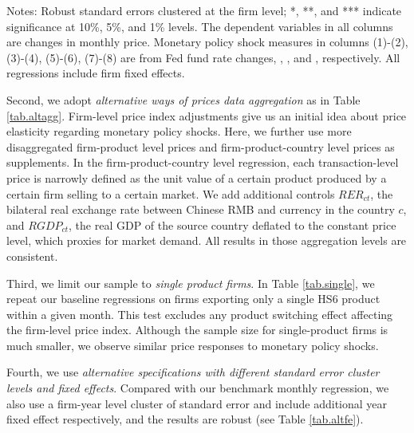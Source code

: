 \begin{table}[htbp]
{\begin{threeparttable}
\begin{tabular}{lcccccccc}
        \bottomrule
    \end{tabular}
        \begin{tablenotes}
            \footnotesize
            \item Notes: Robust standard errors clustered at the firm level;  *, **, and *** indicate significance at 10\%, 5\%, and 1\% levels. The dependent variables in all columns are changes in monthly price. Monetary policy shock measures in columns (1)-(2), (3)-(4), (5)-(6), (7)-(8) are from Fed fund rate changes, \cite{nakamura2018high}, \cite{acosta2022perceived}, and \cite{jarocinski2020deconstructing}, respectively. All regressions include firm fixed effects.
	\end{tablenotes}
    \end{threeparttable}
    }
    \label{tab.altmps}
\end{table}

Second, we adopt \textit{alternative ways of prices data aggregation} as in Table \ref{tab.altagg}. Firm-level price index adjustments give us an initial idea about price elasticity regarding monetary policy shocks. Here, we further use more disaggregated firm-product level prices and firm-product-country level prices as supplements. In the firm-product-country level regression, each transaction-level price is narrowly defined as the unit value of a certain product produced by a certain firm selling to a certain market. We add additional controls $RER_{ct}$, the bilateral real exchange rate between Chinese RMB and currency in the country $c$, and $RGDP_{ct}$, the real GDP of the source country deflated to the constant price level, which proxies for market demand. All results in those aggregation levels are consistent. 

Third, we limit our sample to \textit{single product firms}. In Table \ref{tab.single}, we repeat our baseline regressions on firms exporting only a single HS6 product within a given month. This test excludes any product switching effect affecting the firm-level price index. Although the sample size for single-product firms is much smaller, we observe similar price responses to monetary policy shocks. 

Fourth, we use \textit{alternative specifications with different standard error cluster levels and fixed effects}. Compared with our benchmark monthly regression, we also use a firm-year level cluster of standard error and include additional year fixed effect respectively, and the results are robust (see Table \ref{tab.altfe}).

